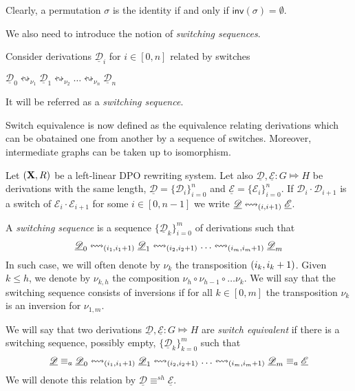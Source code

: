 \documentclass[a4paper,UKenglish,cleveref,pdftex,thm-restate,numberwithinsect,anonymous]{lipics}
\newcommand{\interval}[2][1]{\ensuremath{[{#1},{#2}]}}
\newcommand{\perm}{\sigma}
\def\R{\mathsf{R}}
\def\X{\textbf {\textup{X}}}
\newcommand{\dder}[1]{\mathscr{#1}}
\newcommand{\der}[1]{\underline{\dder{#1}}}
\newcommand{\inv}[1]{\mathsf{inv}({#1})}
\newcommand{\shift}[1]{\ensuremath{\mathrel{{\leftrightsquigarrow}_{#1}}}}
\begin{document}
\begin{remark}
	Clearly, a permutation $\perm$ is the identity if and only if $\inv{\perm}=\emptyset$.
\end{remark}



We also need to introduce the notion of \emph{switching sequences}.


\begin{definition}
Consider derivations $\der{D}_i$ for $i \in \interval[0]{n}$
	related by switches
	\begin{center}
		$\der{D}_0 \shift{\nu_1} \der{D}_1 \shift{\nu_2} \ldots \shift{\nu_n}
		\der{D}_n$
	\end{center}
	It will be referred as a \emph{switching sequence}.  
\end{definition}

Switch equivalence is now defined as the equivalence relating derivations which can be obatained one from another by a sequence of switches. Moreover, intermediate graphs can be taken up to isomorphism.

\begin{definition}
  \label{de:switch-equivalence}
  Let $(\X, \R)$ be a left-linear DPO rewriting system.  Let also
  $\der{D}, \der{E} : G \Mapsto H$ be derivations with the same
  length, $\der{D}=\{\dder{D}_{i}\}_{i=0}^n$ and
  $\der{E}=\{\dder{E}_{i}\}_{i=0}^n$. If
  $\dder{D}_i \cdot \dder{D}_{i+1}$ is a switch of
  $\dder{E}_i \cdot \dder{E}_{i+1}$ for some $i \in [0,n-1]$ we write
  $\der{D} \shift{\transp{i}} \der{E}$. 
  
  A \emph{switching sequence} is  a sequence $\{\der{D}_{k}\}_{i=0}^m$ of derivations such that 
  \[\der{D}_0 \shift{\transp{i_1}} \der{D}_1 \shift{\transp{i_2}} \ldots \shift{\transp{i_m}}
  \der{D}_m\]
 In such case, we will often denote by $\nu_{k}$ the transposition $\transp{i_k}$. Given $k \leq h$,
 we denote by $\nu_{k,h}$ the composition
 $\nu_h \circ \nu_{h-1} \circ \ldots \nu_k$. We will say that the
 switching sequence consists of inversions if for all
 $k \in \interval[0]{m}$ the transposition $\nu_k$ is an inversion for
 $\nu_{1,m}$.
  
  We will say that two derivations $\der{D}, \der{E}:G\Mapsto H$ are \emph{switch
    equivalent} if there is a switching sequence, possibly empty, $\{\der{D}_{k}\}_{k=0}^m$ such that
      \[\der{D}\equiv_a \der{D}_0 \shift{\transp{i_1}} \der{D}_1 \shift{\transp{i_2}} \ldots \shift{\transp{i_m}}
    \der{D}_m\equiv _a \der{E}\]
    We will denote this relation by $\der{D}\equiv^{sh} \der{E}$. 
\end{definition}
\end{document}
